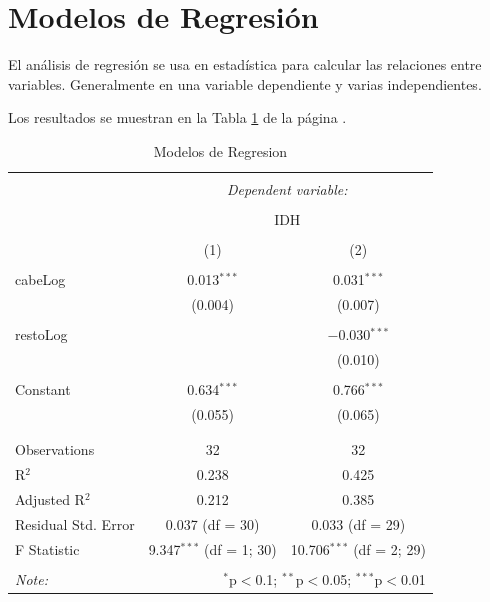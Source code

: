 \documentclass{article}
\begin{document}
\clearpage

\section{Modelos de Regresi\'on}

El an\'alisis de regresi\'on se usa en estad\'istica para calcular las relaciones entre variables. Generalmente en una variable dependiente y varias independientes.

Los resultados se muestran en la Tabla \ref{regresiones} de la p\'agina \pageref{regresiones}.


\begin{table}[!htbp] \centering 
  \caption{Modelos de Regresion} 
  \label{regresiones} 
\begin{tabular}{@{\extracolsep{5pt}}lcc} 
\\[-1.8ex]\hline 
\hline \\[-1.8ex] 
 & \multicolumn{2}{c}{\textit{Dependent variable:}} \\ 
\cline{2-3} 
\\[-1.8ex] & \multicolumn{2}{c}{IDH} \\ 
\\[-1.8ex] & (1) & (2)\\ 
\hline \\[-1.8ex] 
 cabeLog & 0.013$^{***}$ & 0.031$^{***}$ \\ 
  & (0.004) & (0.007) \\ 
  & & \\ 
 restoLog &  & $-$0.030$^{***}$ \\ 
  &  & (0.010) \\ 
  & & \\ 
 Constant & 0.634$^{***}$ & 0.766$^{***}$ \\ 
  & (0.055) & (0.065) \\ 
  & & \\ 
\hline \\[-1.8ex] 
Observations & 32 & 32 \\ 
R$^{2}$ & 0.238 & 0.425 \\ 
Adjusted R$^{2}$ & 0.212 & 0.385 \\ 
Residual Std. Error & 0.037 (df = 30) & 0.033 (df = 29) \\ 
F Statistic & 9.347$^{***}$ (df = 1; 30) & 10.706$^{***}$ (df = 2; 29) \\ 
\hline 
\hline \\[-1.8ex] 
\textit{Note:}  & \multicolumn{2}{r}{$^{*}$p$<$0.1; $^{**}$p$<$0.05; $^{***}$p$<$0.01} \\ 
\end{tabular} 
\end{table} 
\end{document}
